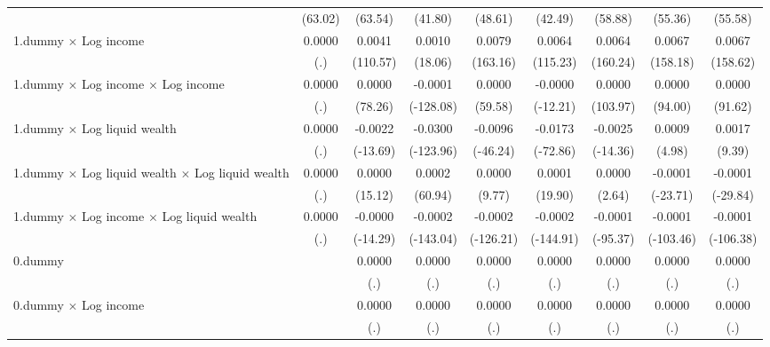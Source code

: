 \begin{table}[htbp]
\begin{tabular}{l*{8}{c}}
                    &     (63.02)&     (63.54)&     (41.80)&     (48.61)&     (42.49)&     (58.88)&     (55.36)&     (55.58)\\
[1em]
1.dummy $\times$ Log income&      0.0000&      0.0041&      0.0010&      0.0079&      0.0064&      0.0064&      0.0067&      0.0067\\
                    &         (.)&    (110.57)&     (18.06)&    (163.16)&    (115.23)&    (160.24)&    (158.18)&    (158.62)\\
[1em]
1.dummy $\times$ Log income $\times$ Log income&      0.0000&      0.0000&     -0.0001&      0.0000&     -0.0000&      0.0000&      0.0000&      0.0000\\
                    &         (.)&     (78.26)&   (-128.08)&     (59.58)&    (-12.21)&    (103.97)&     (94.00)&     (91.62)\\
[1em]
1.dummy $\times$ Log liquid wealth&      0.0000&     -0.0022&     -0.0300&     -0.0096&     -0.0173&     -0.0025&      0.0009&      0.0017\\
                    &         (.)&    (-13.69)&   (-123.96)&    (-46.24)&    (-72.86)&    (-14.36)&      (4.98)&      (9.39)\\
[1em]
1.dummy $\times$ Log liquid wealth $\times$ Log liquid wealth&      0.0000&      0.0000&      0.0002&      0.0000&      0.0001&      0.0000&     -0.0001&     -0.0001\\
                    &         (.)&     (15.12)&     (60.94)&      (9.77)&     (19.90)&      (2.64)&    (-23.71)&    (-29.84)\\
[1em]
1.dummy $\times$ Log income $\times$ Log liquid wealth&      0.0000&     -0.0000&     -0.0002&     -0.0002&     -0.0002&     -0.0001&     -0.0001&     -0.0001\\
                    &         (.)&    (-14.29)&   (-143.04)&   (-126.21)&   (-144.91)&    (-95.37)&   (-103.46)&   (-106.38)\\
[1em]
0.dummy             &            &      0.0000&      0.0000&      0.0000&      0.0000&      0.0000&      0.0000&      0.0000\\
                    &            &         (.)&         (.)&         (.)&         (.)&         (.)&         (.)&         (.)\\
[1em]
0.dummy $\times$ Log income&            &      0.0000&      0.0000&      0.0000&      0.0000&      0.0000&      0.0000&      0.0000\\
                    &            &         (.)&         (.)&         (.)&         (.)&         (.)&         (.)&         (.)\\

\end{tabular}
\end{table}
